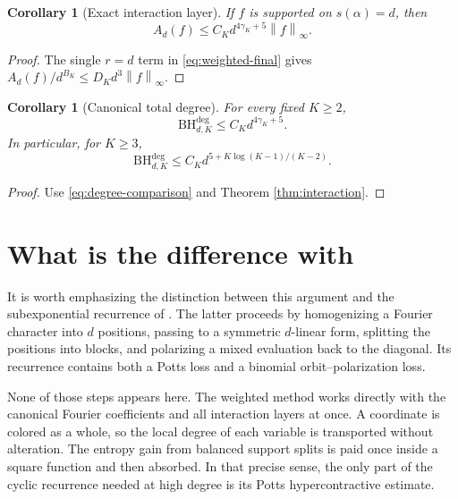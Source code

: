 \documentclass[11pt]{article}
\newtheorem{corollary}[theorem]{Corollary}
\theoremstyle{definition}
\theoremstyle{remark}
\newcommand{\norm}[1]{\left\lVert #1\right\rVert}
\newcommand{\BH}{\mathrm{BH}}
\begin{document}
\begin{corollary}[Exact interaction layer]
\label{cor:exact}
If $f$ is supported on $s(\alpha)=d$, then
\begin{equation}
\label{eq:exact-final}
 A_d(f)\le C_Kd^{4\gamma_K+5}\norm f_\infty.
\end{equation}
\end{corollary}

\begin{proof}
The single $r=d$ term in \eqref{eq:weighted-final} gives
$A_d(f)/d^{B_K}\le D_Kd^3\norm f_\infty$.
\end{proof}

\begin{corollary}[Canonical total degree]
\label{cor:degree}
For every fixed $K\ge2$,
\begin{equation}
\label{eq:degree-final}
 \BH^{\deg}_{d,K}
 \le C_Kd^{4\gamma_K+5}.
\end{equation}
In particular, for $K\ge3$,
\begin{equation}
\label{eq:degree-power}
 \BH^{\deg}_{d,K}
 \le C_Kd^{5+K\log(K-1)/(K-2)}.
\end{equation}
\end{corollary}

\begin{proof}
Use \eqref{eq:degree-comparison} and Theorem \ref{thm:interaction}.
\end{proof}

\section{What is the difference with \cite{PellegrinoRaposo}}

It is worth emphasizing the distinction between this argument and the
subexponential recurrence of \cite{PellegrinoRaposo}.  The latter proceeds by
homogenizing a Fourier character into $d$ positions, passing to a symmetric
$d$-linear form, splitting the positions into blocks, 
and polarizing a mixed evaluation back to the diagonal.  Its
recurrence contains both a Potts loss and a binomial orbit--polarization loss.

None of those steps appears here.  The weighted method works directly with
the canonical Fourier coefficients and all interaction layers at once.  A
coordinate is colored as a whole, so the local degree of each variable is transported
without alteration.  The entropy gain from balanced support splits is paid
once inside a square function and then absorbed.  In that precise sense, the
only part of the cyclic recurrence needed at high degree is its Potts
hypercontractive estimate.
\end{document}
